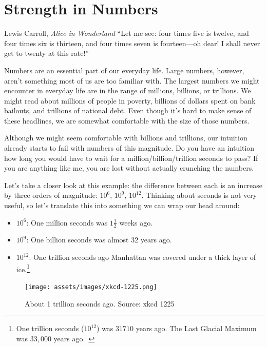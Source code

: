 \chapter{Strength in Numbers}
\label{les:15}

\begin{chapquote}{Lewis Carroll, \textit{Alice in Wonderland}}
\enquote{Let me see: four times five is twelve, and four times six is thirteen, and
four times seven is fourteen—oh dear! I shall never get to twenty at this
rate!}
\end{chapquote}

Numbers are an essential part of our everyday life. Large numbers,
however, aren't something most of us are too familiar with. The largest
numbers we might encounter in everyday life are in the range of
millions, billions, or trillions. We might read about millions of people
in poverty, billions of dollars spent on bank bailouts, and trillions of
national debt. Even though it's hard to make sense of these headlines,
we are somewhat comfortable with the size of those numbers.

Although we might seem comfortable with billions and trillions, our
intuition already starts to fail with numbers of this magnitude. Do you
have an intuition how long you would have to wait for a
million/billion/trillion seconds to pass? If you are anything like me,
you are lost without actually crunching the numbers.

Let's take a closer look at this example: the difference between each is an
increase by three orders of magnitude: $10^6$, $10^9$, $10^{12}$. Thinking about
seconds is not very useful, so let's translate this into something we can wrap
our head around:

\begin{itemize}
  \item $10^6$: One million seconds was $1 \frac{1}{2}$ weeks ago.
  \item $10^9$: One billion seconds was almost 32 years ago.
  \item $10^{12}$: One trillion seconds ago Manhattan was covered under a thick
  layer of ice.\footnote{One trillion seconds ($10^{12}$) was $31710$ years ago. The Last Glacial
  Maximum was $33,000$ years ago.~\cite{wiki:LGM}}
\end{itemize}

\begin{figure}
  \texttt{[image: assets/images/xkcd-1225.png]}
  \caption{About 1 trillion seconds ago. Source: xkcd 1225}
  \label{fig:xkcd-1225}
\end{figure}

